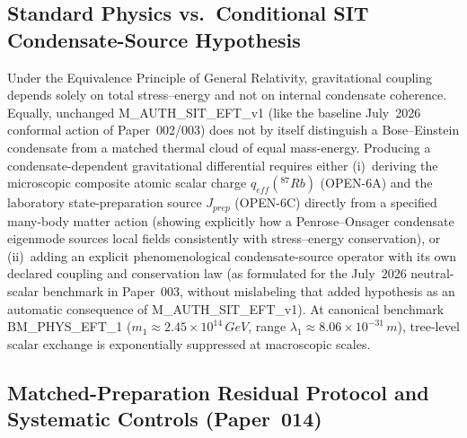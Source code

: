 \documentclass[american,11pt,letterpaper]{article}
\def\mathrm#1{#1}%
\def\texttt#1{#1}%
\def\emph#1{#1}%
\begin{document}
\subsection{Standard Physics vs.\ Conditional SIT Condensate-Source Hypothesis}

Under the Equivalence Principle of General Relativity, gravitational coupling depends solely on total stress--energy and not on internal condensate coherence. Equally, unchanged \texttt{M\_AUTH\_SIT\_EFT\_v1} (like the baseline July~2026 conformal action of Paper~002/003) does \emph{not} by itself distinguish a Bose--Einstein condensate from a matched thermal cloud of equal mass-energy. Producing a condensate-dependent gravitational differential requires either (i)~deriving the microscopic composite atomic scalar charge $q_{\mathrm{eff}}(^{87}\mathrm{Rb})$ (\texttt{OPEN-6A}) and the laboratory state-preparation source $J_{\mathrm{prep}}$ (\texttt{OPEN-6C}) directly from a specified many-body matter action (showing explicitly how a Penrose--Onsager condensate eigenmode sources local fields consistently with stress--energy conservation), or (ii)~adding an explicit phenomenological condensate-source operator with its own declared coupling and conservation law (as formulated for the July~2026 neutral-scalar benchmark in Paper~003, without mislabeling that added hypothesis as an automatic consequence of \texttt{M\_AUTH\_SIT\_EFT\_v1}). At canonical benchmark \texttt{BM\_PHYS\_EFT\_1} ($m_1 \approx 2.45\times 10^{14}\,\mathrm{GeV}$, range $\lambda_1 \approx 8.06\times 10^{-31}\,\mathrm{m}$), tree-level scalar exchange is exponentially suppressed at macroscopic scales.

\subsection{Matched-Preparation Residual Protocol and Systematic Controls (Paper~014)}
\end{document}
